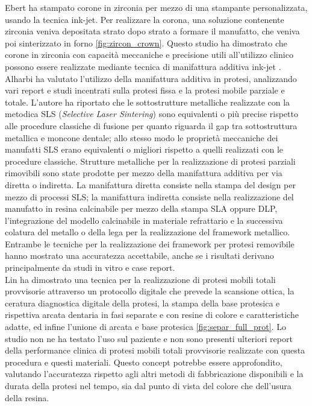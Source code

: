 Ebert ha stampato corone in zirconia per mezzo di una stampante personalizzata, usando la tecnica ink-jet. Per realizzare la corona, una soluzione contenente zirconia veniva depositata strato dopo strato a formare il manufatto, che veniva poi sinterizzato in forno \ref{fig:zircon_crown}. Questo studio ha dimostrato che corone in zirconia con capacità meccaniche e precisione utili all'utilizzo clinico possono essere realizzate mediante tecnica di manifattura additiva ink-jet \parencite{Reference106}.\\
Alharbi \parencite{Reference107} ha valutato l'utilizzo della manifattura additiva in protesi, analizzando vari report e studi incentrati sulla protesi fissa e la protesi mobile parziale e totale. L'autore ha riportato che le sottostrutture metalliche realizzate con la metodica SLS (\emph{Selective Laser Sintering}) sono equivalenti o più precise rispetto alle procedure classiche di fusione per quanto riguarda il gap tra sottostruttura metallica e moncone dentale; allo stesso modo le proprietà meccaniche dei manufatti SLS erano equivalenti o migliori rispetto a quelli realizzati con le procedure classiche. Strutture metalliche per la realizzazione di protesi parziali rimovibili sono state prodotte per mezzo della manifattura additiva per via diretta o indiretta. La manifattura diretta consiste nella stampa del design per mezzo di processi SLS; la manifattura indiretta consiste nella realizzazione del manufatto in resina calcinabile per mezzo della stampa SLA oppure DLP, l'integrazione del modello calcinabile in materiale refrattario e la successiva colatura del metallo o della lega per la realizzazione del framework metallico. Entrambe le tecniche per la realizzazione dei framework per protesi removibile hanno mostrato una accuratezza accettabile, anche se i risultati derivano principalmente da studi in vitro e case report.\\
Lin \parencite{Reference108} ha dimostrato una tecnica per la realizzazione di protesi mobili totali provvisorie attraverso un protocollo digitale che prevede la scansione ottica, la ceratura diagnostica digitale della protesi, la stampa della base protesica e rispettiva arcata dentaria in fasi separate e con resine di colore e caratteristiche adatte, ed infine l'unione di arcata e base protesica \ref{fig:separ_full_prot}. Lo studio non ne ha testato l'uso sul paziente e non sono presenti ulteriori report della performance clinica di protesi mobili totali provvisorie realizzate con questa procedura e questi materiali. Questo concept potrebbe essere approfondito, valutando l'accuratezza rispetto agli altri metodi di fabbricazione disponibili e la durata della protesi nel tempo, sia dal punto di vista del colore che dell'usura della resina.\\
